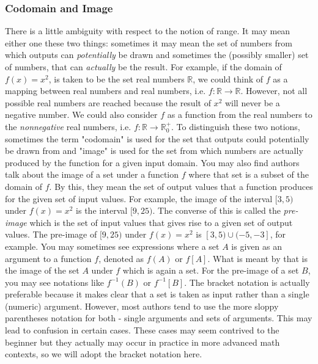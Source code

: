 \subsubsection{Codomain and Image}
There is a little ambiguity with respect to the notion of range. It may mean either one these two things: sometimes it may mean the set of numbers from which outputs can \emph{potentially} be drawn and sometimes the (possibly smaller) set of numbers, that can \emph{actually} be the result. For example, if the domain of $f(x) = x^2$, is taken to be the set real numbers $\mathbb{R}$, we could think of $f$ as a mapping between real numbers and real numbers, i.e. $f: \mathbb{R} \rightarrow \mathbb{R}$. However, not all possible real numbers are reached because the result of $x^2$ will never be a negative number. We could also consider $f$ as a function from the real numbers to the \emph{nonnegative} real numbers, i.e. $f: \mathbb{R} \rightarrow \mathbb{R}^+_0$. To distinguish these two notions, sometimes the term "codomain" is used for the set that outputs could potentially be drawn from and "image" is used for the set from which numbers are actually produced by the function for a given input domain. You may also find authors talk about the image of a set under a function $f$ where that set is a subset of the domain of $f$. By this, they mean the set of output values that a function produces for the given set of input values. For example, the image of the interval $[3,5)$ under $f(x) = x^2$ is the interval $[9,25)$. The converse of this is called the \emph{pre-image} which is the set of input values that gives rise to a given set of output values. The pre-image of $[9,25)$ under $f(x) = x^2$ is $[3,5) \cup (-5,-3]$, for example. You may sometimes see expressions where a set $A$ is given as an argument to a function $f$, denoted as $f(A)$ or $f[A]$. What is meant by that is the image of the set $A$ under $f$ which is again a set. For the pre-image of a set $B$, you may see notations like $f^{-1}(B)$ or  $f^{-1}[B]$. The bracket notation is actually preferable because it makes clear that a set is taken as input rather than a single (numeric) argument. However, most authors tend to use the more sloppy parentheses notation for both - single arguments and sets of arguments. This may lead to confusion in certain cases. These cases may seem contrived to the beginner but they actually may occur in practice in more advanced math contexts, so we will adopt the bracket notation here.


